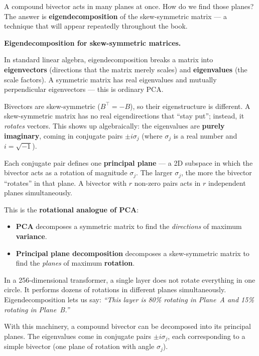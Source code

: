 \documentclass[11pt, twoside, openright]{memoir}
\numberwithin{equation}{chapter}
\begin{document}
A compound bivector acts in many planes at once.  How do we find those
planes?  The answer is \textbf{eigendecomposition} of the
skew-symmetric matrix --- a technique that will appear repeatedly
throughout the book.

\begin{mathbox}
\textbf{Eigendecomposition for skew-symmetric matrices.}

In standard linear algebra, eigendecomposition breaks a matrix into
\textbf{eigenvectors} (directions that the matrix merely scales) and
\textbf{eigenvalues} (the scale factors).  A symmetric matrix has real
eigenvalues and mutually perpendicular eigenvectors --- this is
ordinary PCA.

Bivectors are skew-symmetric ($B^\top = -B$), so their eigenstructure
is different.  A skew-symmetric matrix has no real eigendirections that
``stay put''; instead, it \emph{rotates} vectors.  This shows up
algebraically: the eigenvalues are \textbf{purely imaginary}, coming
in conjugate pairs $\pm i\sigma_j$ (where $\sigma_j$ is a real number
and $i = \sqrt{-1}$).

Each conjugate pair defines one \textbf{principal plane} --- a 2D
subspace in which the bivector acts as a rotation of magnitude
$\sigma_j$.  The larger $\sigma_j$, the more the bivector ``rotates''
in that plane.  A bivector with $r$ non-zero pairs acts in $r$
independent planes simultaneously.

This is the \textbf{rotational analogue of PCA}:
\begin{itemize}[nosep]
\item \textbf{PCA} decomposes a symmetric matrix to find the
  \emph{directions} of maximum \textbf{variance}.
\item \textbf{Principal plane decomposition} decomposes a
  skew-symmetric matrix to find the \emph{planes} of maximum
  \textbf{rotation}.
\end{itemize}
In a 256-dimensional transformer, a single layer does not rotate
everything in one circle.  It performs dozens of rotations in
different planes simultaneously.  Eigendecomposition lets us say:
\emph{``This layer is 80\% rotating in Plane~A and 15\% rotating in
Plane~B.''}
\end{mathbox}

With this machinery, a compound bivector can be decomposed into its
principal planes.  The eigenvalues come in conjugate pairs
$\pm i\sigma_j$, each corresponding to a simple bivector (one plane of
rotation with angle $\sigma_j$).
\end{document}
